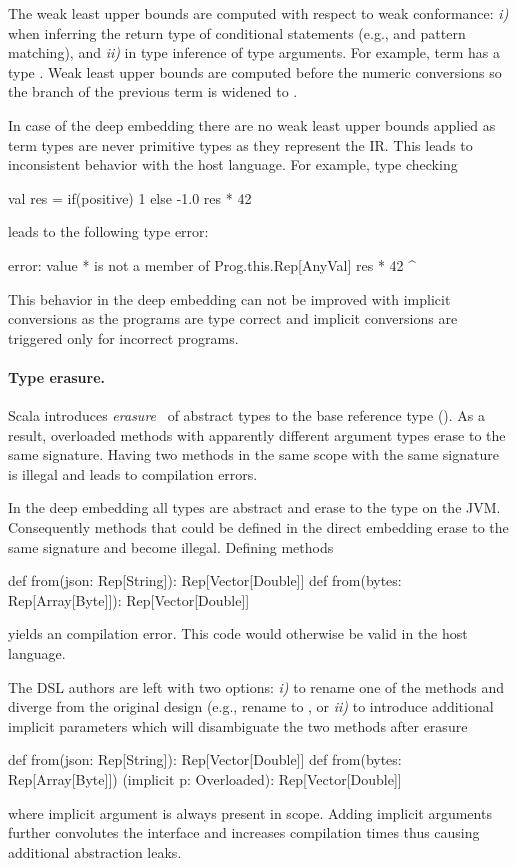 The weak least upper bounds are computed with respect to weak conformance:
 \emph{i)} when inferring the return type of conditional statements (e.g., 
  and pattern matching), and \emph{ii)} in type inference of type arguments. For example,
  term  has a type . Weak least upper bounds
  are computed before the numeric conversions so the  branch of the
  previous term is widened to .

In case of the deep embedding there are no weak least upper bounds applied
 as term types are never primitive types as they represent the IR. This leads to
 inconsistent behavior with the host language. For example, type checking\begin{lstparagraph}
val res = if(positive) 1 else -1.0
res * 42
\end{lstparagraph}leads to the following type error:\begin{lstparagraph}
error: value * is not a member of Prog.this.Rep[AnyVal]
res * 42
    ^
\end{lstparagraph} This behavior in the deep embedding can not be improved with
 implicit conversions as the programs are type correct and implicit conversions
 are triggered only for incorrect programs.

\paragraph{Type erasure.} Scala introduces \emph{erasure}~\cite{odersky_scala_2004} of abstract types to
 the base reference type (). As a result, overloaded methods with apparently different
 argument types erase to the same signature. Having two methods in the same scope
  with the same signature is illegal and leads to compilation errors.

In the deep embedding all types are abstract and erase to the type 
 on the JVM. Consequently methods that could be defined in the direct embedding
 erase to the same signature and become illegal. Defining methods \begin{lstparagraph}
def from(json: Rep[String]): Rep[Vector[Double]]
def from(bytes: Rep[Array[Byte]]): Rep[Vector[Double]]
 \end{lstparagraph} yields an compilation error. This code would otherwise be valid
in the host language.

The DSL authors are left with two options: \emph{i)} to rename one of the methods and diverge from the original design (e.g., rename  to , or \emph{ii)} to introduce additional implicit parameters which will disambiguate the two methods after erasure \begin{lstparagraph}
 def from(json: Rep[String]): Rep[Vector[Double]]
 def from(bytes: Rep[Array[Byte]])
   (implicit p: Overloaded): Rep[Vector[Double]]
\end{lstparagraph}
where implicit argument  is always present in scope. Adding implicit arguments
further convolutes the interface and increases compilation times thus causing additional
abstraction leaks.




